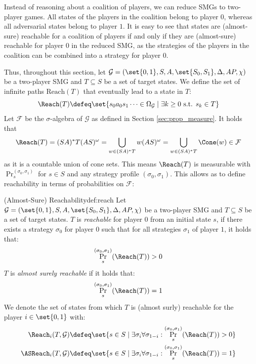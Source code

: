 Instead of reasoning about a coalition of players, we can reduce SMGs to two-player games. All states of the players in the coalition belong to player $0$, whereas all adversarial states belong to player $1$. It is easy to see that states are (almost-sure) reachable for a coalition of players if and only if they are (almost-sure) reachable for player $0$ in the reduced SMG, as the strategies of the players in the coalition can be combined into a strategy for player $0$.

Thus, throughout this section, let $\mathcal{G} = (\set{0, 1}, S, A, \set{S_0, S_1}, \Delta, AP, \chi)$ be a two-player SMG and $T \subseteq S$ be a set of target states. We define the set of infinite paths $\text{Reach}(T)$ that eventually lead to a state in $T$:
\[
    \Reach(T) \defeq \set{s_0 a_0 s_1 \dots \in \Omega_\mathcal{G} \mid \exists k \geq 0 \text{ s.t. } s_k \in T}
\]
Let $\mathcal{F}$ be the $\sigma$-algebra of $\mathcal{G}$ as defined in Section \ref{sec:prop_measure}. It holds that
\[
\Reach(T) = (SA)^\ast T (AS)^\omega = \bigcup_{w \in (SA)^\ast T} w (AS)^\omega = \bigcup_{w \in (SA)^\ast T} \Cone(w) \in \mathcal{F}
\]
as it is a countable union of cone sets. This means $\Reach(T)$ is measurable with $\Pr_s^{(\sigma_0, \sigma_1)}$ for $s \in S$ and any strategy profile $(\sigma_0, \sigma_1)$. This allows as to define reachability in terms of probabilities on $\mathcal{F}$:

\begin{mydefinition}{(Almost-Sure) Reachability}{def:reach}
Let $\mathcal{G} = (\set{0, 1}, S, A, \set{S_0, S_1}, \Delta, AP, \chi)$ be a two-player SMG and $T \subseteq S$ be a set of target states. $T$ is \textit{reachable} for player $0$ from an initial state $s$, if there exists a strategy $\sigma_0$ for player $0$ such that for all strategies $\sigma_1$ of player $1$, it holds that:
\[
\Pr_s^{(\sigma_0, \sigma_1)}(\Reach(T)) > 0
\]
$T$ is \textit{almost surely reachable} if it holds that:
\[
\Pr_s^{(\sigma_0, \sigma_1)}(\Reach(T)) = 1
\]
We denote the set of states from which $T$ is (almost surly) reachable for the player $i\in\set{0, 1}$ with:\begin{align*}
    \Reach_i(T, \mathcal{G})&\defeq\set{s\in S\mid\exists \sigma_i\forall\sigma_{1-i}: \Pr_s^{(\sigma_0, \sigma_1)}(\Reach(T)) > 0}\\
    \ASReach_i(T, \mathcal{G})&\defeq\set{s\in S\mid\exists \sigma_i\forall\sigma_{1-i}: \Pr_s^{(\sigma_0, \sigma_1)}(\Reach(T)) = 1}
\end{align*}
\end{mydefinition}

